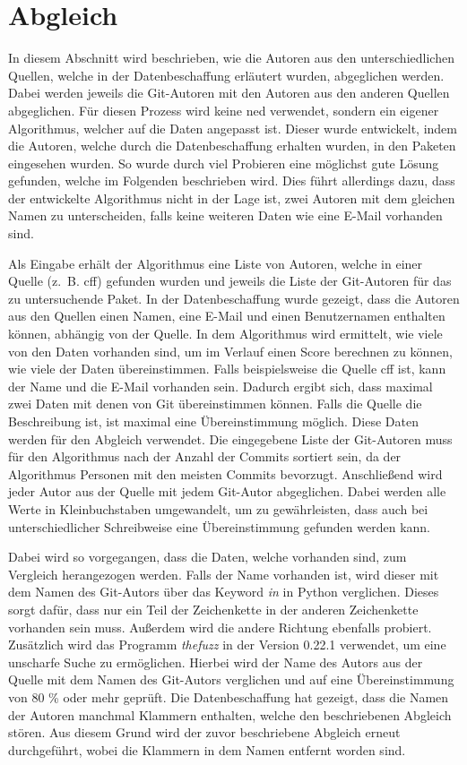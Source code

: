 \section{Abgleich}
\label{sec:abgleich}
In diesem Abschnitt wird beschrieben, wie die Autoren aus den unterschiedlichen Quellen, welche in der Datenbeschaffung erläutert wurden, abgeglichen werden.
Dabei werden jeweils die Git-Autoren mit den Autoren aus den anderen Quellen abgeglichen.
Für diesen Prozess wird keine \gls{ned} verwendet, sondern ein eigener Algorithmus, welcher auf die Daten angepasst ist.
Dieser wurde entwickelt, indem die Autoren, welche durch die Datenbeschaffung erhalten wurden, in den Paketen eingesehen wurden.
So wurde durch viel Probieren eine möglichst gute Lösung gefunden, welche im Folgenden beschrieben wird.
Dies führt allerdings dazu, dass der entwickelte Algorithmus nicht in der Lage ist, zwei Autoren mit dem gleichen Namen zu unterscheiden, falls keine weiteren Daten wie eine E-Mail vorhanden sind.

Als Eingabe erhält der Algorithmus eine Liste von Autoren, welche in einer Quelle (z. B. \gls{cff}) gefunden wurden und jeweils die Liste der Git-Autoren für das zu untersuchende Paket.
In der Datenbeschaffung wurde gezeigt, dass die Autoren aus den Quellen einen Namen, eine E-Mail und einen Benutzernamen enthalten können, abhängig von der Quelle.
In dem Algorithmus wird ermittelt, wie viele von den Daten vorhanden sind, um im Verlauf einen Score berechnen zu können, wie viele der Daten übereinstimmen.
Falls beispielsweise die Quelle \gls{cff} ist, kann der Name und die E-Mail vorhanden sein.
Dadurch ergibt sich, dass maximal zwei Daten mit denen von Git übereinstimmen können.
Falls die Quelle die Beschreibung ist, ist maximal eine Übereinstimmung möglich.
Diese Daten werden für den Abgleich verwendet.
Die eingegebene Liste der Git-Autoren muss für den Algorithmus nach der Anzahl der Commits sortiert sein, da der Algorithmus Personen mit den meisten Commits bevorzugt.
Anschließend wird jeder Autor aus der Quelle mit jedem Git-Autor abgeglichen.
Dabei werden alle Werte in Kleinbuchstaben umgewandelt, um zu gewährleisten, dass auch bei unterschiedlicher Schreibweise eine Übereinstimmung gefunden werden kann.

Dabei wird so vorgegangen, dass die Daten, welche vorhanden sind, zum Vergleich herangezogen werden.
Falls der Name vorhanden ist, wird dieser mit dem Namen des Git-Autors über das Keyword \emph{in} in Python verglichen.
Dieses sorgt dafür, dass nur ein Teil der Zeichenkette in der anderen Zeichenkette vorhanden sein muss.
Außerdem wird die andere Richtung ebenfalls probiert.
Zusätzlich wird das Programm \emph{thefuzz} in der Version 0.22.1 verwendet, um eine unscharfe Suche zu ermöglichen.
Hierbei wird der Name des Autors aus der Quelle mit dem Namen des Git-Autors verglichen und auf eine Übereinstimmung von 80 \% oder mehr geprüft.
Die Datenbeschaffung hat gezeigt, dass die Namen der Autoren manchmal Klammern enthalten, welche den beschriebenen Abgleich stören.
Aus diesem Grund wird der zuvor beschriebene Abgleich erneut durchgeführt, wobei die Klammern in dem Namen entfernt worden sind.

